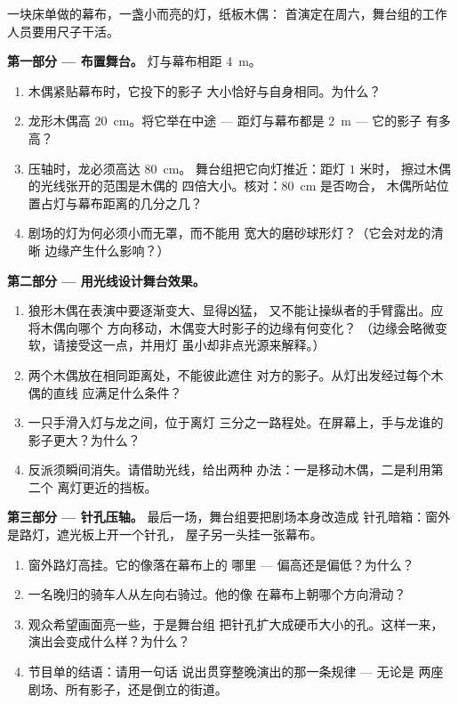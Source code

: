 \begin{problem}\label{pb:g6:light-propagation:1}
一块床单做的幕布，一盏小而亮的灯，纸板木偶：
首演定在周六，舞台组的工作人员要用尺子干活。

\medskip\noindent\textbf{第一部分 --- 布置舞台。}
灯与幕布相距 \qty{4}{m}。
\begin{enumerate}
  \item 木偶紧贴幕布时，它投下的影子
        大小恰好与自身相同。为什么？
  \item 龙形木偶高 \qty{20}{cm}。将它举在中途 ---
        距灯与幕布都是 \qty{2}{m} --- 它的影子
        有多高？
  \item 压轴时，龙必须高达 \qty{80}{cm}。
        舞台组把它向灯推近：距灯 $1$ 米时，
        擦过木偶的光线张开的范围是木偶的
        四倍大小。核对：\qty{80}{cm} 是否吻合，
        木偶所站位置占灯与幕布距离的几分之几？
  \item 剧场的灯为何必须小而无罩，而不能用
        宽大的磨砂球形灯？（它会对龙的清晰
        边缘产生什么影响？）
\end{enumerate}

\medskip\noindent\textbf{第二部分 --- 用光线设计舞台效果。}
\begin{enumerate}[resume]
  \item 狼形木偶在表演中要逐渐变大、显得凶猛，
        又不能让操纵者的手臂露出。应将木偶向哪个
        方向移动，木偶变大时影子的边缘有何变化？
        （边缘会略微变软，请接受这一点，并用灯
        虽小却非点光源来解释。）
  \item 两个木偶放在相同距离处，不能彼此遮住
        对方的影子。从灯出发经过每个木偶的直线
        应满足什么条件？
  \item 一只手滑入灯与龙之间，位于离灯
        三分之一路程处。在屏幕上，手与龙谁的
        影子更大？为什么？
  \item 反派须瞬间消失。请借助光线，给出两种
        办法：一是移动木偶，二是利用第二个
        离灯更近的挡板。
\end{enumerate}

\medskip\noindent\textbf{第三部分 --- 针孔压轴。}
最后一场，舞台组要把剧场本身改造成
针孔暗箱：窗外是路灯，遮光板上开一个针孔，
屋子另一头挂一张幕布。
\begin{enumerate}[resume]
  \item 窗外路灯高挂。它的像落在幕布上的
        哪里 --- 偏高还是偏低？为什么？
  \item 一名晚归的骑车人从左向右骑过。他的像
        在幕布上朝哪个方向滑动？
  \item 观众希望画面亮一些，于是舞台组
        把针孔扩大成硬币大小的孔。这样一来，
        演出会变成什么样？为什么？
  \item 节目单的结语：请用一句话
        说出贯穿整晚演出的那一条规律 --- 无论是
        两座剧场、所有影子，还是倒立的街道。
\end{enumerate}
\end{problem}
